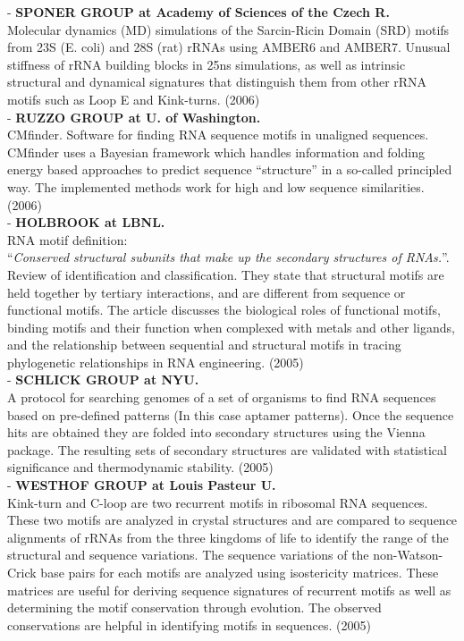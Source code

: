 - \textbf{SPONER GROUP at Academy of Sciences of the Czech R.}\\
Molecular  dynamics (MD) simulations of the Sarcin-Ricin Domain (SRD)
motifs from  23S (E. coli)  and 28S  (rat) rRNAs using AMBER6 and
AMBER7. Unusual stiffness of rRNA  building blocks in 25ns
simulations, as  well as intrinsic structural  and dynamical
signatures that distinguish them from other rRNA motifs such as Loop E
and Kink-turns. (2006)
\cite{spackova2006}\\

- \textbf{RUZZO GROUP at U. of Washington.}\\
CMfinder.  Software for finding RNA sequence motifs in unaligned  sequences.
CMfinder uses a Bayesian  framework which handles information and  folding
energy based approaches  to predict sequence ``structure'' in a so-called
principled way. The implemented methods work for high
and low sequence similarities. (2006)
\cite{yao2006}\\

- \textbf{HOLBROOK at LBNL.}\\
RNA motif definition:\\
``\textit{Conserved  structural subunits that  make up the  secondary
structures of RNAs.}''.\\
Review of identification and
classification. They state that structural
motifs are held together  by tertiary interactions,  and   are
different  from sequence or functional motifs.  The  article discusses
the  biological  roles of  functional motifs, binding motifs and their
function when complexed with metals and other ligands, and the
relationship between sequential and structural motifs in tracing
phylogenetic relationships in RNA engineering. (2005)
\cite{hendrix2005} \cite{holbrook2005}\\

- \textbf{SCHLICK GROUP at NYU.}\\
A protocol for searching genomes of a set of organisms to find RNA
sequences based on pre-defined patterns (In this case aptamer
patterns). Once the sequence hits are
obtained they are folded into secondary structures using the Vienna
package. The resulting sets of secondary structures are validated with
statistical significance and thermodynamic stability. (2005)
\cite{laserson2005}\\

- \textbf{WESTHOF GROUP at Louis Pasteur U.}\\
Kink-turn  and  C-loop are  two  recurrent  motifs  in ribosomal  RNA
sequences. These two motifs are analyzed in crystal structures and are
compared to  sequence alignments of  rRNAs from the three  kingdoms of
life   to  identify  the   range  of   the  structural   and  sequence
variations. The sequence variations of the non-Watson-Crick base pairs
for  each  motifs  are  analyzed using  isostericity  matrices.  These
matrices  are useful  for  deriving sequence  signatures of  recurrent
motifs  as   well  as  determining  the   motif  conservation  through
evolution.  The  observed  conservations  are helpful  in  identifying
motifs in sequences. (2005)
\cite{lescoute2005}\\


